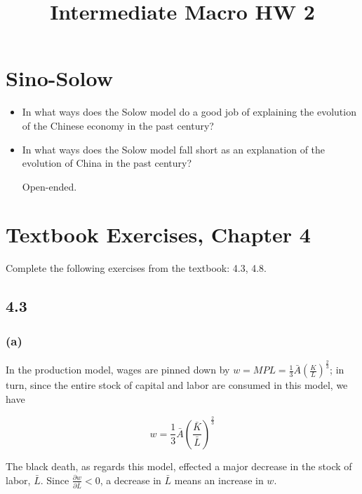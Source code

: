 \documentclass{article}
\begin{document}
\title{Intermediate Macro HW 2}

\maketitle

\section{Sino-Solow}

\begin{itemize}
\item In what ways does the Solow model do a good job of explaining the evolution of the Chinese economy in the past century?

\item In what ways does the Solow model fall short as an explanation of the evolution of China in the past century?

\color{red} 

Open-ended.

\color{black} 

\end{itemize}

\section{Textbook Exercises, Chapter 4}

Complete the following exercises from the textbook: 4.3, 4.8.

\color{red} 

\subsection*{4.3}

\subsubsection*{(a)}

In the production model, wages are pinned down by $w = MPL = \frac13 \bar{A} \left( \frac{K}{L} \right)^{\frac23}$; in turn, since the entire stock of capital and labor are consumed in this model, we have

\[ w =  \frac13 \bar{A} \left( \frac{\bar{K}}{\bar{L}} \right)^{\frac23} \]

The black death, as regards this model, effected a major decrease in the stock of labor, $\bar{L}$. Since $\frac{\partial w}{\partial \bar{L}} < 0$, a decrease in $\bar{L}$ means an increase in $w$.
\end{document}
